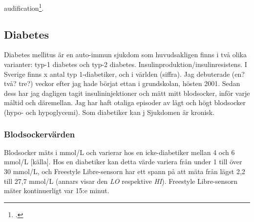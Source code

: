 \documentclass[11pt, a4paper]{article} %
\begin{document}
\gls{audification}\footcite[302]{hermann_audification_2011}.




%
%

\subsection*{Diabetes}

Diabetes mellitus är en auto-immun sjukdom som huvudsakligen finns i två olika varianter: typ-1 diabetes och typ-2 diabetes. Insulinproduktion/insulinresistens. I Sverige finns x antal typ 1-diabetiker, och i världen (siffra). Jag debuterade (en? två? tre?) veckor efter jag hade börjat ettan i grundskolan, hösten 2001. Sedan dess har jag dagligen tagit insulininjektioner och mätt mitt blodsocker, inför varje måltid och däremellan. Jag har haft otaliga episoder av lågt och högt blodsocker (hypo- och hypoglycemi). Som diabetiker kan j Sjukdomen är kronisk.


\subsubsection*{Blodsockervärden}
Blodsocker mäts i mmol/L och varierar hos en icke-diabetiker mellan 4 och 6 mmol/L [källa]. Hos en diabetiker kan detta värde variera från under 1 till över 30 mmol/L, och Freestyle Libre-sensorn har ett spann på att mäta från lägst 2,2 till 27,7 mmol/L (annars visar den \emph{LO} respektive \emph{HI}). Freestyle Libre-sensorn mäter kontinuerligt var 15:e minut.

\end{document}
